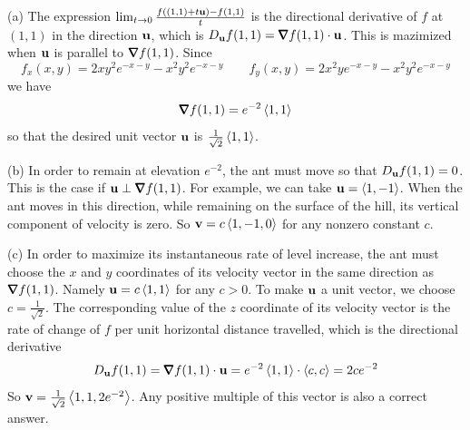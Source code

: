 \begin{solution}
(a) The expression
$
\lim_{t\rightarrow 0}\frac{f((1,1)+t\mathbf{u})-f(1,1)}{t}
$
is the directional derivative of $f$ at $(1,1)$ in the direction $\mathbf{u}$,
which is $D_\vu f(1,1)=\vnabla f(1,1)\cdot\vu$. This is mazimized when $\mathbf{u}$ is
parallel to  $\vnabla f(1,1)$. Since
\begin{equation*}
f_x(x,y)=2xy^2e^{-x-y}-x^2y^2e^{-x-y}\qquad
f_y(x,y)=2x^2ye^{-x-y}-x^2y^2e^{-x-y}
\end{equation*}
we have
\begin{equation*}
\vnabla f(1,1)=e^{-2}\llt 1,1\rgt
\end{equation*}
so that the desired unit vector $\mathbf{u}$ is $\frac{1}{\sqrt{2}}\left< 1,1\right>$.

(b) In order to remain at elevation $e^{-2}$, the ant must move so
that $D_{\mathbf{u}} f(1,1)=0$. This is the case if $\vu\perp\vnabla f(1,1)$.
For example, we can take $\mathbf{u}=\left< 1,-1\right>$. When the ant moves 
in this direction, while remaining on the surface of the hill, its 
vertical component of velocity is zero. So $\mathbf{v}=c\left< 1,-1,0\right>$ for any 
nonzero constant $c$.

(c) In order to maximize its instantaneous rate of level increase,
the ant must choose the $x$ and $y$ coordinates of its velocity vector
in the same direction as  $\vnabla f(1,1)$. Namely $\mathbf{u}=c\left< 1,1\right>$ for any
$c>0$. To make $\mathbf{u}$ a unit vector, we choose $c=\frac{1}{\sqrt{2}}$.
The corresponding value of the $z$ coordinate of its velocity vector is
the rate of change of $f$ per unit horizontal distance travelled, which
is the directional derivative 
\begin{equation*}
D_\vu f(1,1)=\vnabla f(1,1)\cdot\vu=e^{-2}\llt 1,1\rgt \cdot\llt c,c\rgt
=2ce^{-2}
\end{equation*}
 So $\mathbf{v}=\frac{1}{\sqrt{2}}\left< 1,1,2e^{-2}\right>$. Any positive multiple
of this vector is also a correct answer.
\end{solution}

